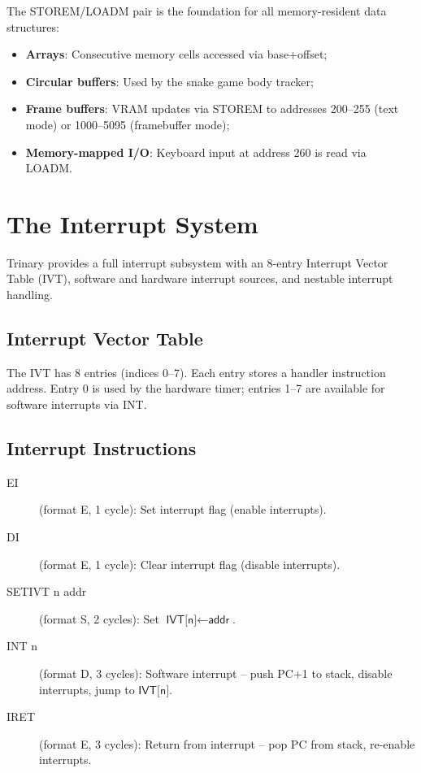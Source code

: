 \documentclass[12pt,a4paper,twoside]{book}
\theoremstyle{trinarytheorem}
\theoremstyle{trinarydefinition}
\newcommand{\code}[1]{\textsf{#1}}
\begin{document}
The STOREM/LOADM pair is the foundation for all memory-resident data structures:
\begin{itemize}
    \item \textbf{Arrays}: Consecutive memory cells accessed via base+offset;
    \item \textbf{Circular buffers}: Used by the snake game body tracker;
    \item \textbf{Frame buffers}: VRAM updates via STOREM to addresses 200--255
          (text mode) or 1000--5095 (framebuffer mode);
    \item \textbf{Memory-mapped I/O}: Keyboard input at address 260 is read via
          LOADM.
\end{itemize}

\chapter{The Interrupt System}
\label{ch:interrupts}

Trinary provides a full interrupt subsystem with an 8-entry Interrupt Vector Table
(IVT), software and hardware interrupt sources, and nestable interrupt handling.

\section{Interrupt Vector Table}

The IVT has 8 entries (indices 0--7). Each entry stores a handler instruction address.
Entry 0 is used by the hardware timer; entries 1--7 are available for software
interrupts via INT.

\section{Interrupt Instructions}

\begin{description}
    \item[\code{EI}] (format E, 1 cycle): Set interrupt flag (enable interrupts).
    \item[\code{DI}] (format E, 1 cycle): Clear interrupt flag (disable interrupts).
    \item[\code{SETIVT n addr}] (format S, 2 cycles): Set $\code{IVT[n]} \gets
          \code{addr}$.
    \item[\code{INT n}] (format D, 3 cycles): Software interrupt -- push PC+1 to
          stack, disable interrupts, jump to $\code{IVT[n]}$.
    \item[\code{IRET}] (format E, 3 cycles): Return from interrupt -- pop PC from
          stack, re-enable interrupts.
\end{description}
\end{document}
